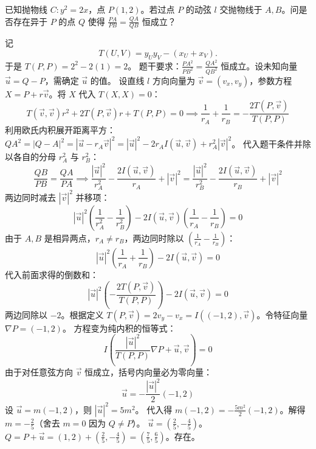 \begin{exercise}[阿氏圆]
已知抛物线 $C: y^2 = 2x$，点 $P(1,2)$。若过点 $P$ 的动弦 $l$ 交抛物线于 $A, B$。问是否存在异于 $P$ 的点 $Q$ 使得 $\frac{PA}{PB} = \frac{QA}{QB}$ 恒成立？
\end{exercise}
\begin{solution}
记
\[
T(U,V) = y_U y_V - (x_U + x_V).
\]
于是 $T(P,P) = 2^2 - 2(1) = 2$。
题干要求：$\frac{PA^2}{PB^2} = \frac{QA^2}{QB^2}$ 恒成立。设未知向量 $\vec{u} = Q - P$，需确定 $\vec{u}$ 的值。
设直线 $l$ 方向向量为 $\vec{v} = (v_x, v_y)$，参数方程 $X = P + r\vec{v}$。将 $X$ 代入 $T(X,X) = 0$：
$$ T(\vec{v},\vec{v}) r^2 + 2T(P, \vec{v}) r + T(P,P) = 0\implies \frac{1}{r_A} + \frac{1}{r_B} = -\frac{2T(P, \vec{v})}{T(P,P)} $$
利用欧氏内积展开距离平方：$QA^2 = |Q-A|^2 = |\vec{u} - r_A\vec{v}|^2 = |\vec{u}|^2 - 2r_A I(\vec{u}, \vec{v}) + r_A^2 |\vec{v}|^2$。
代入题干条件并除以各自的分母 $r_A^2$ 与 $r_B^2$：
$$\frac{QB}{PB} = \frac{QA}{PA}\implies \frac{|\vec{u}|^2}{r_A^2} - \frac{2I(\vec{u}, \vec{v})}{r_A} + |\vec{v}|^2 = \frac{|\vec{u}|^2}{r_B^2} - \frac{2I(\vec{u}, \vec{v})}{r_B} + |\vec{v}|^2 $$
两边同时减去 $|\vec{v}|^2$ 并移项：
$$ |\vec{u}|^2 \left(\frac{1}{r_A^2} - \frac{1}{r_B^2}\right) - 2I(\vec{u}, \vec{v}) \left(\frac{1}{r_A} - \frac{1}{r_B}\right) = 0 $$
由于 $A, B$ 是相异两点，$r_A \neq r_B$，两边同时除以 $(\frac{1}{r_A} - \frac{1}{r_B})$：
$$ |\vec{u}|^2 \left(\frac{1}{r_A} + \frac{1}{r_B}\right) - 2I(\vec{u}, \vec{v}) = 0 $$
代入前面求得的倒数和：
$$ |\vec{u}|^2 \left(-\frac{2T(P, \vec{v})}{T(P,P)}\right) - 2I(\vec{u}, \vec{v}) = 0 $$
两边同除以 $-2$。根据定义 $T(P, \vec{v}) = 2v_y - v_x = I( (-1, 2), \vec{v} )$。令特征向量 $\nabla P = (-1, 2)$。
方程变为纯内积的恒等式：
$$ I \left( \frac{|\vec{u}|^2}{T(P,P)} \nabla P + \vec{u}, \vec{v} \right) = 0 $$
由于对任意弦方向 $\vec{v}$ 恒成立，括号内向量必为零向量：
$$ \vec{u} = -\frac{|\vec{u}|^2}{2} (-1, 2) $$
设 $\vec{u} = m(-1, 2)$，则 $|\vec{u}|^2 = 5m^2$。
代入得 $m(-1,2) = -\frac{5m^2}{2}(-1,2)$。解得 $m = -\frac{2}{5}$（舍去 $m=0$ 因为 $Q \neq P$）。
$\vec{u} = (\frac{2}{5}, -\frac{4}{5})$。
$Q = P + \vec{u} = (1,2) + (\frac{2}{5}, -\frac{4}{5}) = (\frac{7}{5}, \frac{6}{5})$。存在。
\end{solution}


